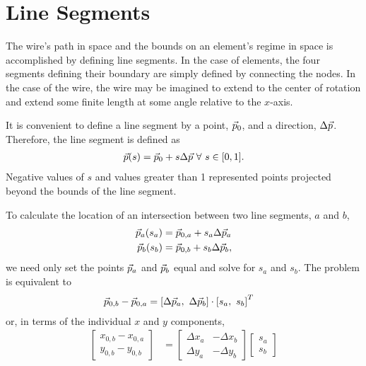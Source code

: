 \section{Line Segments}\label{sec:segments}

The wire's path in space and the bounds on an element's regime in space is accomplished by defining line segments.  In the case of elements, the four segments defining their boundary are simply defined by connecting the nodes.  In the case of the wire, the wire may be imagined to extend to the center of rotation and extend some finite length at some angle relative to the $x$-axis.

It is convenient to define a line segment by a point, $\vec{p}_0$, and a direction, $\Delta \vec{p}$.  Therefore, the line segment is defined as
\begin{align}
\vec{p}(s) = \vec{p}_0 + s \Delta \vec{p} \ \forall \ s\in[0,1].
\end{align}
Negative values of $s$ and values greater than 1 represented points projected beyond the bounds of the line segment.  

To calculate the location of an intersection between two line segments, $a$ and $b$,
\begin{align}
\vec{p}_a(s_a) &= \vec{p}_{0,a} + s_a \Delta \vec{p}_a\nonumber\\
\vec{p}_b(s_b) &= \vec{p}_{0,b} + s_b \Delta \vec{p}_b\nonumber,
\end{align}
we need only set the points $\vec{p}_a$ and $\vec{p}_b$ equal and solve for $s_a$ and $s_b$.  The problem is equivalent to
\begin{align}
\vec{p}_{0,b} - \vec{p}_{0,a} &= \left[\Delta \vec{p}_a,\ \Delta \vec{p}_b\right] \cdot \left[s_a,\ s_b\right]^T
\end{align}
or, in terms of the individual $x$ and $y$ components,
\begin{align}
\left[\begin{array}{c}
x_{0,b} - x_{0,a}\\
y_{0,b} - y_{0,b}
\end{array}\right] &= 
\left[\begin{array}{cc}
\Delta x_a & -\Delta x_b\\
\Delta y_a & -\Delta y_b
\end{array}\right]\left[\begin{array}{c}
s_a \\
s_b
\end{array}\right]
\end{align}

